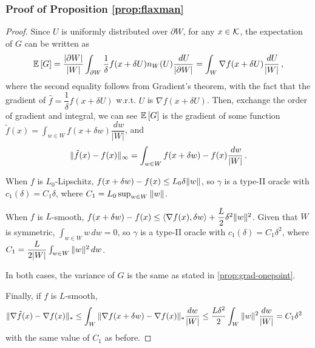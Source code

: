 
\subsubsection*{Proof of Proposition \ref{prop:flaxman}}
\begin{proof}
Since $U$ is uniformly distributed over $\partial W$, for any $x \in \mathcal{K}$, the expectation of $G$ can be written as
\begin{align*}
\mathbb{E}\left[G\right] =\dfrac{\lvert \partial W\rvert}{\lvert W \rvert} \int_{\partial W} \dfrac{1}{\delta} f(x+\delta U)n_W(U)\dfrac{\,d U}{\lvert \partial W\rvert}
=  \int_W \nabla f(x+\delta U)\dfrac{\,d U}{\lvert W\rvert}\,,
\end{align*}
where the second equality follows from Gradient's theorem, with the fact that the gradient of $\hat{f} =\dfrac{1}{\delta} f(x+\delta U) $ w.r.t. $U$ is $\nabla f(x+\delta U)$. Then, exchange the order of gradient and integral, we can see $\mathbb{E}\left[G\right]$ is the gradient of some function
$\tilde{f}(x) =\int_{w \in W} f(x+\delta w)\dfrac{\,d w}{\lvert W\rvert} $, and
\[
\|\tilde{f}(x)-f(x)\|_\infty =\int_{w \in W} f(x+\delta w)-f(x)\dfrac{\,d w}{\lvert W\rvert} \,.
\]

When $f$ is $L_0$-Lipschitz, $f(x+\delta w)-f(x) \le L_0\delta \|w\|$, so $\gamma$ is a type-II oracle with $c_1(\delta) = C_1 \delta$, where $C_1 = L_0 \sup_{w\in W}\|w\|$.

When $f$ is $L$-smooth,  $f(x+\delta w)-f(x) \le \langle \nabla f(x), \delta w \rangle+\dfrac{L}{2}\delta^2 \|w\|^2$. Given that $W$ is symmetric, $\int_{w \in W}w\,d w=0$, so $\gamma$ is a type-II oracle with $c_1(\delta)=C_1 \delta^2$, where $C_1 = \dfrac{L}{2 |W|}\int_{w\in W}\|w\|^2\,d w$.

In both cases, the variance of $G$ is the same as stated in \cref{prop:grad-onepoint}.

Finally, if $f$ is $L$-smooth,
\begin{align*}
\|\nabla \tilde{f}(x)- \nabla f(x)\|_*
&\le \int_W \|\nabla f(x+\delta w) - \nabla f(x)\|_* \frac{dw}{|W|}
\le \frac{L\delta^2}{2}\int_W \|w\|^2 \frac{dw}{|W|} = C_1 \delta^2
\end{align*}
with the same value of $C_1$ as before.
\end{proof}


